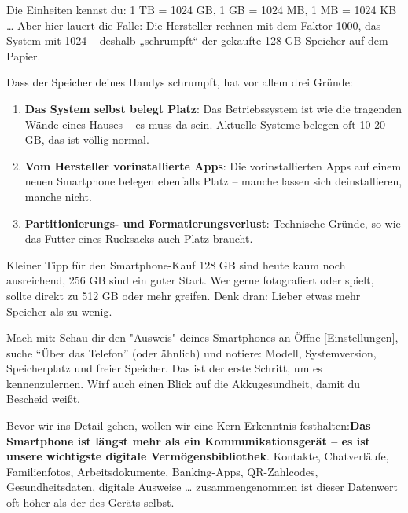 
Die Einheiten kennst du: 1 TB = 1024 GB, 1 GB = 1024 MB, 1 MB = 1024 KB … Aber hier lauert die Falle: Die Hersteller rechnen mit dem Faktor 1000, das System mit 1024 – deshalb „schrumpft“ der gekaufte 128-GB-Speicher auf dem Papier.

Dass der Speicher deines Handys schrumpft, hat vor allem drei Gründe:

\begin{enumerate}
  \item \textbf{Das System selbst belegt Platz}: Das Betriebssystem ist wie die tragenden Wände eines Hauses – es muss da sein. Aktuelle Systeme belegen oft 10-20 GB, das ist völlig normal.
  \item \textbf{Vom Hersteller vorinstallierte Apps}: Die vorinstallierten Apps auf einem neuen Smartphone belegen ebenfalls Platz – manche lassen sich deinstallieren, manche nicht.
  \item \textbf{Partitionierungs- und Formatierungsverlust}: Technische Gründe, so wie das Futter eines Rucksacks auch Platz braucht.
\end{enumerate}

\begin{tcbinfo}{Kleiner Tipp für den Smartphone-Kauf}
128 GB sind heute kaum noch ausreichend, 256 GB sind ein guter Start. Wer gerne fotografiert oder spielt, sollte direkt zu 512 GB oder mehr greifen. Denk dran: Lieber etwas mehr Speicher als zu wenig.

\end{tcbinfo}

\begin{tcbpractice}{Mach mit: Schau dir den "Ausweis" deines Smartphones an}
Öffne [Einstellungen], suche “Über das Telefon” (oder ähnlich) und notiere: Modell, Systemversion, Speicherplatz und freier Speicher. Das ist der erste Schritt, um es kennenzulernen. Wirf auch einen Blick auf die Akkugesundheit, damit du Bescheid weißt.

\end{tcbpractice}


Bevor wir ins Detail gehen, wollen wir eine Kern-Erkenntnis festhalten:\textbf{Das Smartphone ist längst mehr als ein Kommunikationsgerät – es ist unsere wichtigste digitale Vermögensbibliothek}. Kontakte, Chatverläufe, Familienfotos, Arbeitsdokumente, Banking-Apps, QR-Zahlcodes, Gesundheitsdaten, digitale Ausweise … zusammengenommen ist dieser Datenwert oft höher als der des Geräts selbst.

